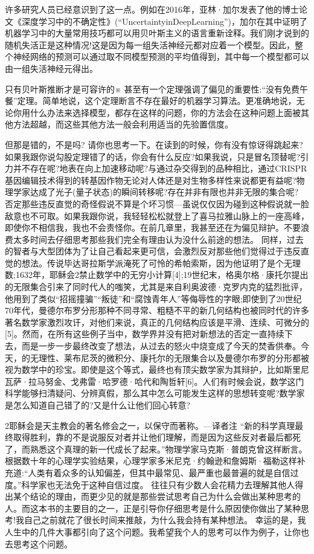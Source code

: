 许多研究人员已经意识到了这一点。例如在2016年，亚林·加尔发表了他的博士论文《深度学习中的不确定性》(“UncertaintyinDeepLearning”)，加尔在其中证明了机器学习中的大量常用技巧都可以用贝叶斯主义的语言重新诠释。我们刚才说到的随机失活正是这种情况!这是因为每一组失活神经元都对应着一个模型。因此，整个神经网络的预测可以通过取不同模型预测的平均值得到，其中每一个模型都可以由一组失活神经元得出。

只有贝叶斯推断才是可容许的※
甚至有一个定理强调了偏见的重要性:“没有免费午餐”定理。简单地说，这个定理断言不存在最好的机器学习算法。更准确地说，无论你用什么办法来选择模型，都存在这样的问题，你的方法会在这种问题上面被其他方法超越，而这些其他方法一般会利用适当的先验置信度。


但那是错的，不是吗?
请你也思考一下。在读到的时候，你有没有惊讶得跳起来?如果我跟你说勾股定理错了的话，你会有什么反应?如果我说，只是冒名顶替呢?引力并不存在呢?地表在向上加速移动呢?与通过杂交得到的品种相比，通过CRISPR基因编辑技术得到的转基因作物无论对人体还是对生物多样性来说都更有益呢?物理学家达成了光子(量子状态)的瞬间转移呢?存在并非有限也并非无限的集合呢?
否定那些违反直觉的奇怪假说不算是个坏习惯---虽说仅仅因为碰到这种假说就一脸敌意也不可取。如果我跟你说，我轻轻松松就登上了喜马拉雅山脉上的一座高峰，即使你不相信我，我也不会责怪你。在前几章里，我甚至还在为偏见辩护。不要浪费太多时间去仔细思考那些我们完全有理由认为没什么前途的想法。
同样，过去的智者与大型团体为了让自己看起来更可信，会激烈反对那些他们觉得过于违反直觉的想法。传说毕达哥拉斯学派淹死了可怜的希帕索斯，因为他证明了是个无理数;1632年，耶稣会2禁止数学中的无穷小计算[4];19世纪末，格奥尔格·康托尔提出的无限集合引来了同时代人的嗤笑，尤其是来自利奥波德·克罗内克的猛烈批评，他用到了类似“招摇撞骗”“叛徒”和“腐蚀青年人”等侮辱性的字眼;即使到了20世纪70年代，曼德尔布罗分形那种不同寻常、粗糙不平的新几何结构也被同时代的许多著名数学家激烈攻讦，对他们来说，真正的几何结构应该是平滑、连续、可微分的[5]。然而，在所有这些例子当中，数学界并没有把对新想法的否定一直持续下去，而是一步一步最终改变了想法，从过去的怒火中烧变成了今天的焚香供奉。今天，的无理性、莱布尼茨的微积分、康托尔的无限集合以及曼德尔布罗的分形都被视为数学中的珍宝。即使是这个等式，最终也有顶尖数学家为其辩护，比如斯里尼瓦萨·拉马努金、戈弗雷·哈罗德·哈代和陶哲轩[6]。人们有时候会说，数学这门科学能够扫清疑问、分辨真假，那么其中怎么可能发生这样的思想转变呢?数学家是怎么知道自己错了的?又是什么让他们回心转意?

2耶稣会是天主教会的著名修会之一，以保守而著称。---译者注
“新的科学真理最终取得胜利，靠的不是说服反对者并让他们理解，而是因为这些反对者最后都死了，而熟悉这个真理的新一代成长了起来。”物理学家马克斯·普朗克曾这样断言。根据数十年的心理学实验结果，心理学家多米尼克·约翰逊和詹姆斯·福勒这样补充道:“人类有着众多的认知偏差，但其中最常见、最严重也最普遍的就是自信过度。”科学家也无法免于这种自信过度。
往往只有少数人会花精力去理解其他人得出某个结论的理由，而更少见的就是那些尝试思考自己为什么会做出某种思考的人。而这本书的主要目的之一，正是引导你仔细思考是什么原因使你做出了某种思考!我自己之前就花了很长时间来推敲，为什么我会持有某种想法。
幸运的是，我人生中的几件大事都引向了这个问题。我希望我个人的思考可以作为例子，让你也去思考这个问题。


